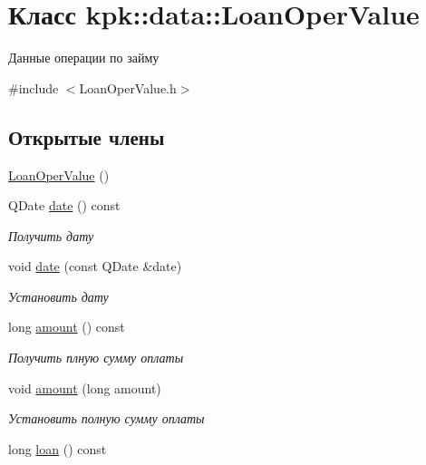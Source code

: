 \hypertarget{classkpk_1_1data_1_1_loan_oper_value}{}\section{Класс kpk\+:\+:data\+:\+:Loan\+Oper\+Value}
\label{classkpk_1_1data_1_1_loan_oper_value}


Данные операции по займу  




{\ttfamily \#include $<$Loan\+Oper\+Value.\+h$>$}

\subsection*{Открытые члены}
\begin{DoxyCompactItemize}
\item 
\hyperlink{classkpk_1_1data_1_1_loan_oper_value_a85a3528d4888aa7977098f2641b2cf12}{Loan\+Oper\+Value} ()
\item 
Q\+Date \hyperlink{classkpk_1_1data_1_1_loan_oper_value_a79a69dfe8b0585d044da833ae6fb499c}{date} () const 
\begin{DoxyCompactList}\small\item\em Получить дату \end{DoxyCompactList}\item 
void \hyperlink{classkpk_1_1data_1_1_loan_oper_value_a666ebe276be1ee68f7daa6b71b32102e}{date} (const Q\+Date \&date)
\begin{DoxyCompactList}\small\item\em Установить дату \end{DoxyCompactList}\item 
long \hyperlink{classkpk_1_1data_1_1_loan_oper_value_a7c02ccfb03583b86685063c794bfb127}{amount} () const 
\begin{DoxyCompactList}\small\item\em Получить плную сумму оплаты \end{DoxyCompactList}\item 
void \hyperlink{classkpk_1_1data_1_1_loan_oper_value_a674d9125b2b2529a05c83aa3247488ea}{amount} (long amount)
\begin{DoxyCompactList}\small\item\em Установить полную сумму оплаты \end{DoxyCompactList}\item 
long \hyperlink{classkpk_1_1data_1_1_loan_oper_value_a62abaf1afa796f4ab870b3eaf28c52a3}{loan} () const 

\end{DoxyCompactItemize}
